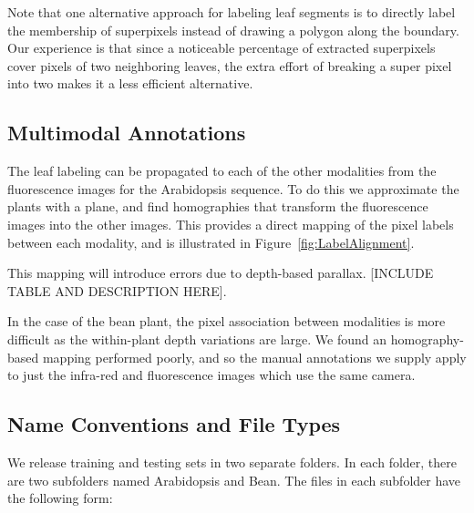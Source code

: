 Note that one alternative approach for labeling leaf segments is to directly label the membership of superpixels instead of drawing a polygon along the boundary.
Our experience is that since a noticeable percentage of extracted superpixels cover pixels of two neighboring leaves, the extra effort of breaking a super pixel into two makes it a less efficient alternative.

\subsection{Multimodal Annotations}

The leaf labeling can be propagated to each of the other modalities from the fluorescence images for the Arabidopsis sequence.  To do this we approximate the plants with a plane, and find homographies that transform the fluorescence images into the other images.  This provides a direct mapping of the pixel labels between each modality, and is illustrated in Figure~\ref{fig:LabelAlignment}.  

This mapping will introduce errors due to depth-based parallax.  [INCLUDE TABLE AND DESCRIPTION HERE].

In the case of the bean plant, the pixel association between modalities is more difficult as the within-plant depth variations are large.  We found an homography-based mapping performed poorly, and so the manual annotations we supply apply to just the infra-red and fluorescence images which use the same camera.  


\subsection{Name Conventions and File Types}
We release training and testing sets in two separate folders.
In each folder, there are two subfolders named Arabidopsis and Bean.
The files in each subfolder have the following form:


